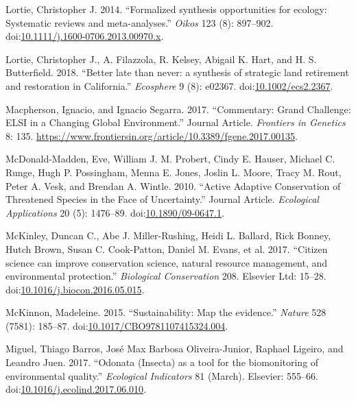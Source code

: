 \documentclass[fleqn,10pt]{wlpeerj} %
\begin{document}
\hypertarget{ref-Lortie2014}{}
Lortie, Christopher J. 2014. ``Formalized synthesis opportunities for
ecology: Systematic reviews and meta-analyses.'' \emph{Oikos} 123 (8):
897--902.
doi:\href{https://doi.org/10.1111/j.1600-0706.2013.00970.x}{10.1111/j.1600-0706.2013.00970.x}.

\hypertarget{ref-Lortie2018}{}
Lortie, Christopher J., A. Filazzola, R. Kelsey, Abigail K. Hart, and H.
S. Butterfield. 2018. ``Better late than never: a synthesis of strategic
land retirement and restoration in California.'' \emph{Ecosphere} 9 (8):
e02367. doi:\href{https://doi.org/10.1002/ecs2.2367}{10.1002/ecs2.2367}.

\hypertarget{ref-Macpherson2017}{}
Macpherson, Ignacio, and Ignacio Segarra. 2017. ``Commentary: Grand
Challenge: ELSI in a Changing Global Environment.'' Journal Article.
\emph{Frontiers in Genetics} 8: 135.
\url{https://www.frontiersin.org/article/10.3389/fgene.2017.00135}.

\hypertarget{ref-McDonald2010}{}
McDonald-Madden, Eve, William J. M. Probert, Cindy E. Hauser, Michael C.
Runge, Hugh P. Possingham, Menna E. Jones, Joslin L. Moore, Tracy M.
Rout, Peter A. Vesk, and Brendan A. Wintle. 2010. ``Active Adaptive
Conservation of Threatened Species in the Face of Uncertainty.'' Journal
Article. \emph{Ecological Applications} 20 (5): 1476--89.
doi:\href{https://doi.org/10.1890/09-0647.1}{10.1890/09-0647.1}.

\hypertarget{ref-McKinley2017}{}
McKinley, Duncan C., Abe J. Miller-Rushing, Heidi L. Ballard, Rick
Bonney, Hutch Brown, Susan C. Cook-Patton, Daniel M. Evans, et al. 2017.
``Citizen science can improve conservation science, natural resource
management, and environmental protection.'' \emph{Biological
Conservation} 208. Elsevier Ltd: 15--28.
doi:\href{https://doi.org/10.1016/j.biocon.2016.05.015}{10.1016/j.biocon.2016.05.015}.

\hypertarget{ref-McKinnon2015}{}
McKinnon, Madeleine. 2015. ``Sustainability: Map the evidence.''
\emph{Nature} 528 (7581): 185--87.
doi:\href{https://doi.org/10.1017/CBO9781107415324.004}{10.1017/CBO9781107415324.004}.

\hypertarget{ref-Miguel2017}{}
Miguel, Thiago Barros, José Max Barbosa Oliveira-Junior, Raphael
Ligeiro, and Leandro Juen. 2017. ``Odonata (Insecta) as a tool for the
biomonitoring of environmental quality.'' \emph{Ecological Indicators}
81 (March). Elsevier: 555--66.
doi:\href{https://doi.org/10.1016/j.ecolind.2017.06.010}{10.1016/j.ecolind.2017.06.010}.
\end{document}
